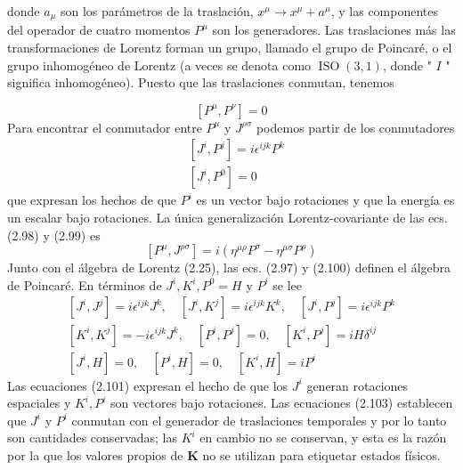 {    donde $a_{\mu}$ son los parámetros de la traslación, $x^{\mu} \rightarrow x^{\mu}+a^{\mu}$, y las componentes del operador de cuatro momentos $P^{\mu}$ son los generadores. Las traslaciones más las transformaciones de Lorentz forman un grupo, llamado el grupo de Poincaré, o el grupo inhomogéneo de Lorentz (a veces se denota como $\operatorname{ISO}(3,1)$, donde " $I$ " significa inhomogéneo). Puesto que las traslaciones conmutan, tenemos

    \begin{equation*}
      \left[P^{\mu}, P^{\nu}\right]=0 \tag{2.97}
      \end{equation*}
      Para encontrar el conmutador entre $P^{\mu}$ y $J^{\rho \sigma}$ podemos partir de los conmutadores
      \begin{align*}
        & {\left[J^{i}, P^{j}\right]=i \epsilon^{i j k} P^{k}}  \tag{2.98}\\
        & {\left[J^{i}, P^{0}\right]=0} \tag{2.99}
        \end{align*}
        que expresan los hechos de que $P^{i}$ es un vector bajo rotaciones y que la energía es un escalar bajo rotaciones. La única generalización Lorentz-covariante de las ecs. (2.98) y (2.99) es
        \begin{equation*}
          \left[P^{\mu}, J^{\rho \sigma}\right]=i\left(\eta^{\mu \rho} P^{\sigma}-\eta^{\mu \sigma} P^{\rho}\right) \tag{2.100}
          \end{equation*}
          Junto con el álgebra de Lorentz (2.25), las ecs. (2.97) y (2.100) definen el álgebra de Poincaré. En términos de $J^{i}, K^{i}, P^{0}=H$ y $P^{i}$ se lee
          \begin{gather*}
            {\left[J^{i}, J^{j}\right]=i \epsilon^{i j k} J^{k}, \quad\left[J^{i}, K^{j}\right]=i \epsilon^{i j k} K^{k}, \quad\left[J^{i}, P^{j}\right]=i \epsilon^{i j k} P^{k}}  \tag{2.101}\\
            {\left[K^{i}, K^{j}\right]=-i \epsilon^{i j k} J^{k}, \quad\left[P^{i}, P^{j}\right]=0, \quad\left[K^{i}, P^{j}\right]=i H \delta^{i j}}  \tag{2.102}\\
            {\left[J^{i}, H\right]=0, \quad\left[P^{i}, H\right]=0, \quad\left[K^{i}, H\right]=i P^{i}} \tag{2.103}
            \end{gather*}
            Las ecuaciones (2.101) expresan el hecho de que los $J^{i}$ generan rotaciones espaciales y $K^{i}, P^{i}$ son vectores bajo rotaciones. Las ecuaciones (2.103) establecen que $J^{i}$ y $P^{i}$ conmutan con el generador de traslaciones temporales y por lo tanto son cantidades conservadas; las $K^{i}$ en cambio no se conservan, y esta es la razón por la que los valores propios de $\mathbf{K}$ no se utilizan para etiquetar estados físicos.
}
